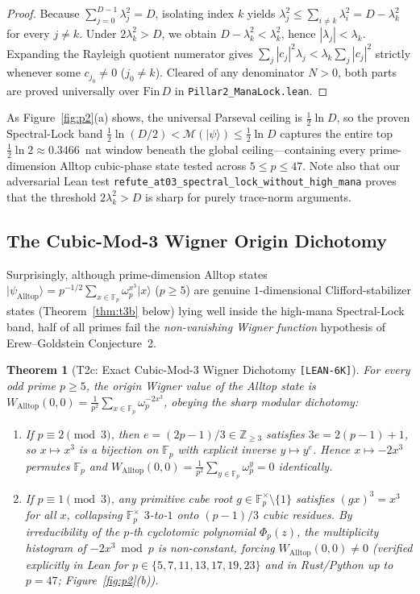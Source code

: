 \documentclass[11pt,letterpaper]{article}
\theoremstyle{plain}
\newtheorem{theorem}{Theorem}[section]
\theoremstyle{definition}
\theoremstyle{remark}
\newcommand{\F}{\mathbb{F}}
\newcommand{\Z}{\mathbb{Z}}
\newcommand{\Mana}{\mathcal{M}}
\newcommand{\ket}[1]{\lvert #1 \rangle}
\newcommand{\leanref}[1]{\textnormal{\texttt{\footnotesize #1}}}
\newcommand{\tagbadge}[1]{\textnormal{\texttt{\small [#1]}}}
\begin{document}
\begin{proof}
Because $\sum_{j=0}^{D-1}\lambda_j^2=D$, isolating index $k$ yields $\lambda_j^2\le \sum_{i\neq k}\lambda_i^2 = D-\lambda_k^2$ for every $j\neq k$. Under $2\lambda_k^2>D$, we obtain $D-\lambda_k^2<\lambda_k^2$, hence $|\lambda_j|<\lambda_k$. Expanding the Rayleigh quotient numerator gives $\sum_j |c_j|^2\lambda_j < \lambda_k\sum_j|c_j|^2$ strictly whenever some $c_{j_0}\neq 0$ ($j_0\neq k$). Cleared of any denominator $N>0$, both parts are proved universally over $\mathrm{Fin}\,D$ in \leanref{Pillar2\_ManaLock.lean}.
\end{proof}

As Figure~\ref{fig:p2}(a) shows, the universal Parseval ceiling is $\tfrac{1}{2}\ln D$, so the proven Spectral-Lock band $\tfrac{1}{2}\ln(D/2)<\Mana(\ket{\psi})\le \tfrac{1}{2}\ln D$ captures the entire top $\tfrac{1}{2}\ln 2 \approx 0.3466$~nat window beneath the global ceiling---containing every prime-dimension Alltop cubic-phase state tested across $5\le p\le 47$. Note also that our adversarial Lean test \leanref{refute\_at03\_spectral\_lock\_without\_high\_mana} proves that the threshold $2\lambda_k^2>D$ is sharp for purely trace-norm arguments.

\subsection{The Cubic-Mod-3 Wigner Origin Dichotomy}

Surprisingly, although prime-dimension Alltop states $\ket{\psi_{\mathrm{Alltop}}}=p^{-1/2}\sum_{x\in\F_p}\omega_p^{x^3}\ket{x}$ ($p\ge 5$) are genuine $1$-dimensional Clifford-stabilizer states (Theorem~\ref{thm:t3b} below) lying well inside the high-mana Spectral-Lock band, half of all primes fail the \emph{non-vanishing Wigner function} hypothesis of Erew--Goldstein Conjecture~2.

\begin{theorem}[{T2c: Exact Cubic-Mod-3 Wigner Dichotomy \tagbadge{LEAN-6K}}]
\label{thm:t2c}
For every odd prime $p\ge 5$, the origin Wigner value of the Alltop state is $W_{\mathrm{Alltop}}(0,0)=\frac{1}{p^2}\sum_{x\in\F_p}\omega_p^{-2x^3}$, obeying the sharp modular dichotomy:
\begin{enumerate}[leftmargin=2em,itemsep=2pt]
  \item If $p\equiv 2\pmod 3$, then $e=(2p-1)/3\in\Z_{\ge 3}$ satisfies $3e=2(p-1)+1$, so $x\mapsto x^3$ is a bijection on $\F_p$ with explicit inverse $y\mapsto y^e$. Hence $x\mapsto -2x^3$ permutes $\F_p$ and $W_{\mathrm{Alltop}}(0,0)=\frac{1}{p^2}\sum_{y\in\F_p}\omega_p^y = 0$ identically.
  \item If $p\equiv 1\pmod 3$, any primitive cube root $g\in\F_p^\times\setminus\{1\}$ satisfies $(gx)^3=x^3$ for all $x$, collapsing $\F_p^\times$ $3$-to-$1$ onto $(p-1)/3$ cubic residues. By irreducibility of the $p$-th cyclotomic polynomial $\Phi_p(z)$, the multiplicity histogram of $-2x^3\bmod p$ is non-constant, forcing $W_{\mathrm{Alltop}}(0,0)\neq 0$ (verified explicitly in Lean for $p\in\{5,7,11,13,17,19,23\}$ and in Rust/Python up to $p=47$; Figure~\ref{fig:p2}(b)).
\end{enumerate}
\end{theorem}
\end{document}
